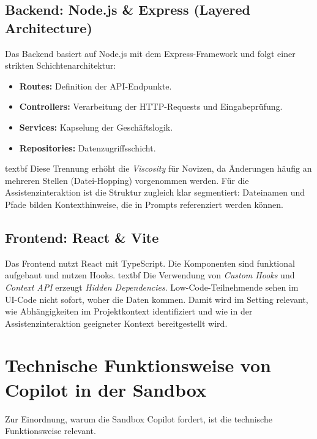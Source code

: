 \subsection{Backend: Node.js \& Express (Layered Architecture)}
Das Backend basiert auf Node.js mit dem Express-Framework und folgt einer strikten Schichtenarchitektur:
\begin{itemize}
    \item  \textbf{Routes:} Definition der API-Endpunkte.
    \item  \textbf{Controllers:} Verarbeitung der HTTP-Requests und Eingabeprüfung.
    \item  \textbf{Services:} Kapselung der Geschäftslogik.
    \item  \textbf{Repositories:} Datenzugriffsschicht.
\end{itemize}
    \csname textbf Diese Trennung erhöht die \emph{Viscosity} für Novizen, da Änderungen häufig an mehreren Stellen (Datei-Hopping) vorgenommen werden. Für die Assistenzinteraktion ist die Struktur zugleich klar segmentiert: Dateinamen und Pfade bilden Kontexthinweise, die in Prompts referenziert werden können.

\subsection{Frontend: React \& Vite}
Das Frontend nutzt React mit TypeScript. Die Komponenten sind funktional aufgebaut und nutzen Hooks.
    \csname textbf Die Verwendung von \emph{Custom Hooks} und \emph{Context API} erzeugt \emph{Hidden Dependencies}. Low-Code-Teilnehmende sehen im UI-Code nicht sofort, woher die Daten kommen. Damit wird im Setting relevant, wie Abhängigkeiten im Projektkontext identifiziert und wie in der Assistenzinteraktion geeigneter Kontext bereitgestellt wird.

\section{Technische Funktionsweise von Copilot in der Sandbox}

Zur Einordnung, warum die Sandbox Copilot fordert, ist die technische Funktionsweise relevant.

